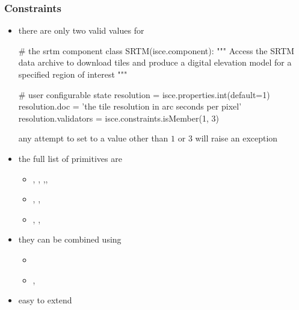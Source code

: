 \begin{frame}[fragile]
%
  \frametitle{Constraints}
%
  \begin{itemize}
%
  \item there are only two valid values for 
%
    \begin{ipython}[firstnumber=4, gobble=6]{}
      # the srtm component
      class SRTM(isce.component):
          """
          Access the SRTM data archive to download tiles and produce
          a digital elevation model for a specified region of interest
          """

          # user configurable state
          resolution = isce.properties.int(default=1)
          resolution.doc = 'the tile resolution in arc seconds per pixel'
          resolution.validators = isce.constraints.isMember(1, 3)
    \end{ipython}
%
    any attempt to set  to a value other than $1$ or $3$ will raise an
    exception
%
  \item the full list of primitives are
    \begin{itemize}
    \item {}, ,
      ,, 
    \item {}, , 
    \item {}, , 
    \end{itemize}
%
  \item they can be combined using
    \begin{itemize}
    \item {}
    \item {}, 
    \end{itemize}
%
  \item easy to extend
%
  \end{itemize}
%
\end{frame}


